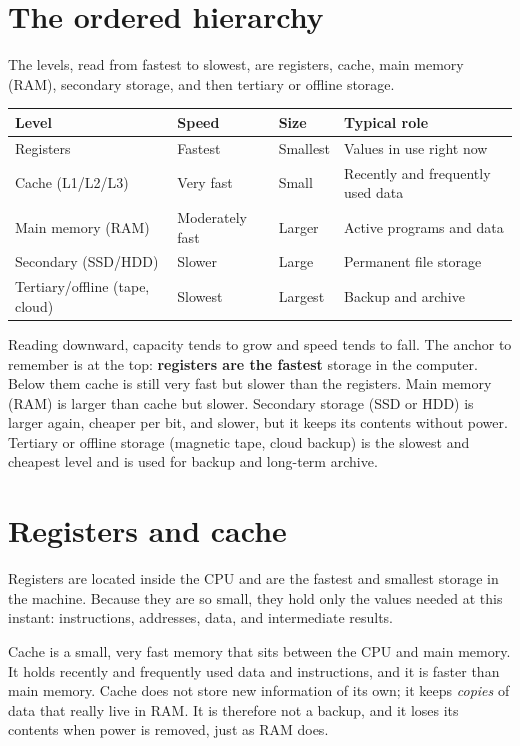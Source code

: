\section{The ordered hierarchy}
The levels, read from fastest to slowest, are registers, cache, main memory
(RAM), secondary storage, and then tertiary or offline storage.

\begin{center}
\begin{tabular}{p{}p{}p{}p{}}
\toprule
\textbf{Level} & \textbf{Speed} & \textbf{Size} & \textbf{Typical role} \\
\midrule
Registers & Fastest & Smallest & Values in use right now \\
Cache (L1/L2/L3) & Very fast & Small & Recently and frequently used data \\
Main memory (RAM) & Moderately fast & Larger & Active programs and data \\
Secondary (SSD/HDD) & Slower & Large & Permanent file storage \\
Tertiary/offline (tape, cloud) & Slowest & Largest & Backup and archive \\
\bottomrule
\end{tabular}
\end{center}

Reading downward, capacity tends to grow and speed tends to fall. The
anchor to remember is at the top: \textbf{registers are the fastest} storage
in the computer. Below them cache is still very fast but slower than the
registers. Main memory (RAM) is larger than cache but slower. Secondary
storage (SSD or HDD) is larger again, cheaper per bit, and slower, but it
keeps its contents without power. Tertiary or offline storage (magnetic
tape, cloud backup) is the slowest and cheapest level and is used for backup
and long-term archive.

\section{Registers and cache}
Registers are located inside the CPU and are the fastest and smallest
storage in the machine. Because they are so small, they hold only the values
needed at this instant: instructions, addresses, data, and intermediate
results.

Cache is a small, very fast memory that sits between the CPU and main
memory. It holds recently and frequently used data and instructions, and it
is faster than main memory. Cache does not store new information of its own;
it keeps \emph{copies} of data that really live in RAM. It is therefore not
a backup, and it loses its contents when power is removed, just as RAM does.

